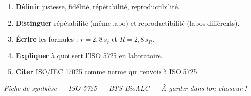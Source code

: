 \documentclass[11pt,a4paper]{article}
\begin{document}
\begin{retenir}[title={\faGraduationCap\quad Ce que tu dois savoir pour l'examen}]
\begin{enumerate}[leftmargin=1.2cm, itemsep=2pt]
    \item \textbf{Définir} justesse, fidélité, répétabilité, reproductibilité.
    \item \textbf{Distinguer} répétabilité (même labo) et reproductibilité (labos différents).
    \item \textbf{Écrire} les formules : \(r = 2{,}8\,s_r\) et \(R = 2{,}8\,s_R\).
    \item \textbf{Expliquer} à quoi sert l'ISO 5725 en laboratoire.
    \item \textbf{Citer} ISO/IEC 17025 comme norme qui renvoie à ISO 5725.
\end{enumerate}
\end{retenir}

\vspace{0.4cm}

\begin{center}
\textit{Fiche de synthèse — ISO 5725 — BTS BioALC — À garder dans ton classeur !}
\end{center}
\end{document}
